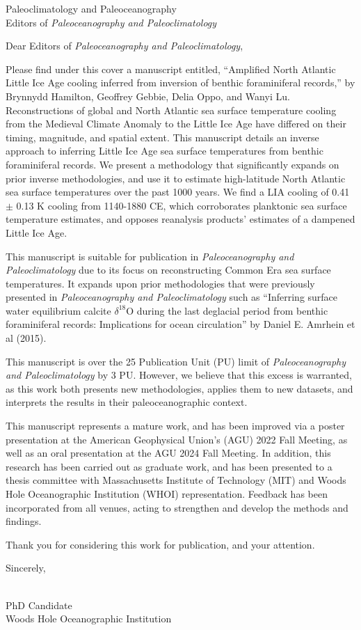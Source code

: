 \documentclass[12pt]{WHOIletter}
\begin{document}
\begin{letter}{
Paleoclimatology and Paleoceanography \\
Editors of {\it Paleoceanography and Paleoclimatology} \\
}
\opening{Dear Editors of {\it Paleoceanography and Paleoclimatology},} 

Please find under this cover a manuscript entitled, ``Amplified North Atlantic Little Ice Age cooling inferred from inversion of benthic foraminiferal records,'' by Brynnydd Hamilton, Geoffrey Gebbie, Delia Oppo, and Wanyi Lu. Reconstructions of global and North Atlantic sea surface temperature cooling from the Medieval Climate Anomaly to the Little Ice Age have differed on their timing, magnitude, and spatial extent. This manuscript details an inverse approach to inferring Little Ice Age sea surface temperatures from benthic foraminiferal records. We present a methodology that significantly expands on prior inverse methodologies, and use it to estimate high-latitude North Atlantic sea surface temperatures over the past 1000 years. We find a LIA cooling of 0.41 $\pm$ 0.13 K cooling from 1140-1880 CE, which corroborates planktonic sea surface temperature estimates, and opposes reanalysis products' estimates of a dampened Little Ice Age.

This manuscript is suitable for publication in \textit{Paleoceanography and Paleoclimatology} due to its focus on reconstructing Common Era sea surface temperatures. It expands upon prior methodologies that were previously presented in \textit{Paleoceanography and Paleoclimatology} such as ``Inferring surface water equilibrium calcite $\delta^{18}$O during the last
deglacial period from benthic foraminiferal records: Implications for ocean circulation'' by Daniel E. Amrhein et al (2015).

This manuscript is over the 25 Publication Unit (PU) limit of \textit{Paleoceanography and Paleoclimatology} by 3 PU. However, we believe that this excess is warranted, as this work both presents new methodologies, applies them to new datasets, and interprets the results in their paleoceanographic context. 

This manuscript represents a mature work, and has been improved via a poster presentation at the American Geophysical Union's (AGU) 2022 Fall Meeting, as well as an oral presentation at the AGU 2024 Fall Meeting. In addition, this research has been carried out as graduate work, and has been presented to a thesis committee with Massachusetts Institute of Technology (MIT) and Woods Hole Oceanographic Institution (WHOI) representation. Feedback has been incorporated from all venues, acting to strengthen and develop the methods and findings. 

Thank you for considering this work for publication, and your attention.

\closing{Sincerely,}
\WHOIname\\PhD Candidate\\Woods Hole Oceanographic Institution

\end{letter}
\end{document}
